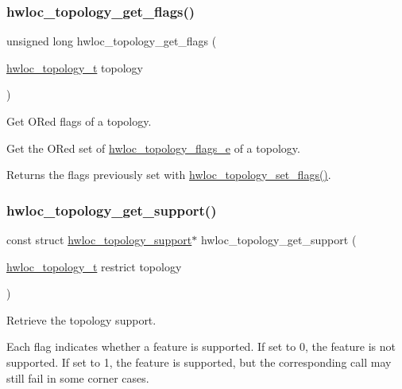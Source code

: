 \subsubsection{\texorpdfstring{hwloc\+\_\+topology\+\_\+get\+\_\+flags()}{hwloc\_topology\_get\_flags()}}
{\footnotesize\ttfamily unsigned long hwloc\+\_\+topology\+\_\+get\+\_\+flags (\begin{DoxyParamCaption}\item[{\hyperlink{a00186_ga9d1e76ee15a7dee158b786c30b6a6e38}{hwloc\+\_\+topology\+\_\+t}}]{topology }\end{DoxyParamCaption})}



Get OR\textquotesingle{}ed flags of a topology. 

Get the OR\textquotesingle{}ed set of \hyperlink{a00193_gada025d3ec20b4b420f8038d23d6e7bde}{hwloc\+\_\+topology\+\_\+flags\+\_\+e} of a topology.

\begin{DoxyReturn}{Returns}
the flags previously set with \hyperlink{a00193_gaaeed4df656979e5f16befea9d29b814b}{hwloc\+\_\+topology\+\_\+set\+\_\+flags()}. 
\end{DoxyReturn}
\mbox{\label{a00193_gab8c76173c4a8ce1a9a9366012b1388e6}} 
\subsubsection{\texorpdfstring{hwloc\+\_\+topology\+\_\+get\+\_\+support()}{hwloc\_topology\_get\_support()}}
{\footnotesize\ttfamily const struct \hyperlink{a00306}{hwloc\+\_\+topology\+\_\+support}$\ast$ hwloc\+\_\+topology\+\_\+get\+\_\+support (\begin{DoxyParamCaption}\item[{\hyperlink{a00186_ga9d1e76ee15a7dee158b786c30b6a6e38}{hwloc\+\_\+topology\+\_\+t} restrict}]{topology }\end{DoxyParamCaption})}



Retrieve the topology support. 

Each flag indicates whether a feature is supported. If set to 0, the feature is not supported. If set to 1, the feature is supported, but the corresponding call may still fail in some corner cases.

